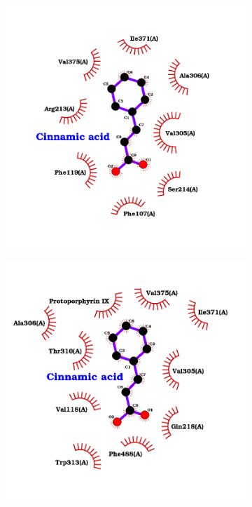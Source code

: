 \documentclass[12pt]{article}
\begin{document}
\begin{figure}[h!]
\begin{subfigure}[h!]{0.35\textwidth}
			\caption{}
		\end{subfigure}
		\hfill
		\begin{subfigure}[h!]{0.35\textwidth}
			\hspace{2cm}
			\includegraphics[width=\textwidth]{../2/Dock/Dock2/best3.png}
			\caption{}
		\end{subfigure}
		\hfill
		\begin{subfigure}[h!]{0.35\textwidth}
			\hspace{-2cm}
			\includegraphics[width=\textwidth]{../2/Dock/Dock2/best4.png}

\end{subfigure}
\end{figure}
\end{document}
